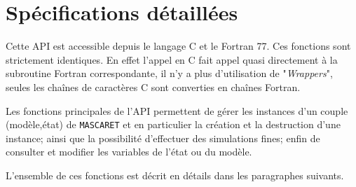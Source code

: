 \documentclass[a4paper,11pt]{article}
\begin{document}
\section{Sp\'ecifications d\'etaill\'ees}

 Cette API est accessible depuis le langage C et le Fortran 77. Ces fonctions sont strictement identiques. En effet l'appel en C fait appel quasi directement \`a la subroutine Fortran correspondante, il n'y a plus d'utilisation de "\textit{Wrappers}", seules les cha\^ines de caract\`eres C sont converties en cha\^ines Fortran.
 
 \vspace{0.5cm}
 
 Les fonctions principales de l'API permettent de g\'erer les instances d'un couple (mod\`ele,\'etat) de \texttt{MASCARET} et en particulier la cr\'eation et la destruction d'une instance; ainsi que la possibilit\'e d'effectuer des simulations fines; enfin de consulter et modifier les variables de l'\'etat ou du mod\`ele.
 
 \vspace{0.5cm}
 
 L'ensemble de ces fonctions est d\'ecrit en d\'etails dans les paragraphes suivants.
 
 \vspace{0.5cm}
 
 \vspace{0.5cm}  
\end{document}
